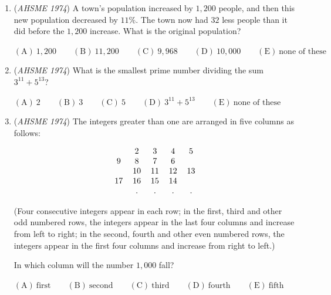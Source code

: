 \begin{enumerate}
 $\mathrm{(A)\ } \text{``*" is commutative but not associative} \qquad$
$\mathrm{(B) \ }\text{``*" is associative but not commutative} \qquad$
$\mathrm{(C) \  } \text{``*" is neither commutative nor associative} \qquad$
$\mathrm{(D) \  } \text{``*" is commutative and associative} \qquad$
$\mathrm{(E) \  }\text{none of these} \qquad$


	\item (\textit{AHSME 1974}) A town's population increased by $1,200$ people, and then this new population decreased by $11\%$. The town now had $32$ less people than it did before the $1,200$ increase. What is the original population?


 $\mathrm{(A)\ } 1,200 \qquad \mathrm{(B) \ }11,200 \qquad \mathrm{(C) \  } 9,968 \qquad \mathrm{(D) \  } 10,000 \qquad \mathrm{(E) \  }\text{none of these}$


	\item (\textit{AHSME 1974}) What is the smallest prime number dividing the sum $3^{11}+5^{13}$?


 $\mathrm{(A)\ } 2 \qquad \mathrm{(B) \ }3 \qquad \mathrm{(C) \  } 5 \qquad \mathrm{(D) \  } 3^{11}+5^{13} \qquad \mathrm{(E) \  }\text{none of these}$


	\item (\textit{AHSME 1974}) The integers greater than one are arranged in five columns as follows:


 
 \[\begin{tabular}{c c c c c}\ & 2 & 3 & 4 & 5\\ 9 & 8 & 7 & 6 &\ \\ \ & 10 & 11 & 12 & 13\\ 17 & 16 & 15 & 14 &\ \\ \ & . & . & . & .\\ \end{tabular}\]


 (Four consecutive integers appear in each row; in the first, third and other odd numbered rows, the integers appear in the last four columns and increase from left to right; in the second, fourth and other even numbered rows, the integers appear in the first four columns and increase from right to left.)


 In which column will the number $1,000$ fall?


 $\mathrm{(A)\ } \text{first} \qquad \mathrm{(B) \ }\text{second} \qquad \mathrm{(C) \  } \text{third} \qquad \mathrm{(D) \  } \text{fourth} \qquad \mathrm{(E) \  }\text{fifth}$



\end{enumerate}
